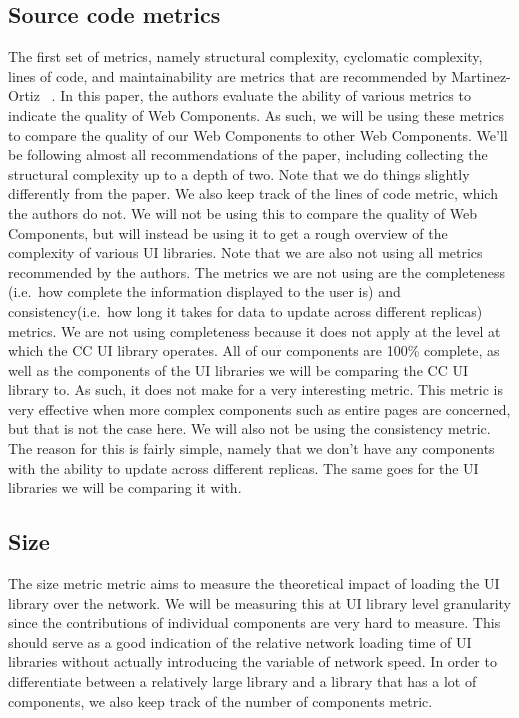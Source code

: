 \subsection{Source code metrics}
The first set of metrics, namely structural complexity, cyclomatic complexity, lines of code, and maintainability are metrics that are recommended by Martinez-Ortiz \etal{}~\cite{martinez-ortiz2016quality}. In this paper, the authors evaluate the ability of various metrics to indicate the quality of Web Components. As such, we will be using these metrics to compare the quality of our Web Components to other Web Components. We'll be following almost all recommendations of the paper, including collecting the structural complexity up to a depth of two. Note that we do things slightly differently from the paper. We also keep track of the lines of code metric, which the authors do not. We will not be using this to compare the quality of Web Components, but will instead be using it to get a rough overview of the complexity of various UI libraries. Note that we are also not using all metrics recommended by the authors. The metrics we are not using are the completeness (i.e.~how complete the information displayed to the user is) and consistency(i.e.~how long it takes for data to update across different replicas) metrics. We are not using completeness because it does not apply at the level at which the CC UI library operates. All of our components are 100\% complete, as well as the components of the UI libraries we will be comparing the CC UI library to. As such, it does not make for a very interesting metric. This metric is very effective when more complex components such as entire pages are concerned, but that is not the case here. We will also not be using the consistency metric. The reason for this is fairly simple, namely that we don't have any components with the ability to update across different replicas. The same goes for the UI libraries we will be comparing it with.

\subsection{Size}
The size metric metric aims to measure the theoretical impact of loading the UI library over the network. We will be measuring this at UI library level granularity since the contributions of individual components are very hard to measure. This should serve as a good indication of the relative network loading time of UI libraries without actually introducing the variable of network speed. In order to differentiate between a relatively large library and a library that has a lot of components, we also keep track of the number of components metric.

